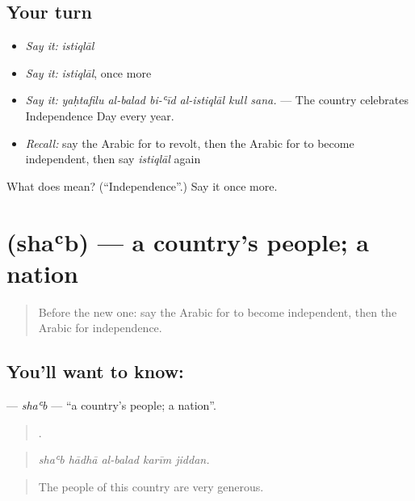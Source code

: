 \subsection*{Your turn}
\begin{itemize}
\raggedright
  \item \emph{Say it:} \emph{istiqlāl}
  \item \emph{Say it:} \emph{istiqlāl}, once more
  \item \emph{Say it:} \emph{yaḥtafilu al-balad bi-ʿīd al-istiqlāl kull sana.} — The country celebrates Independence Day every year.
  \item \emph{Recall:} say the Arabic for to revolt, then the Arabic for to become independent, then say \emph{istiqlāl} again
\end{itemize}

\begin{tcolorbox}[breakable,colback=teal!4,colframe=teal!35!black,title={Before you move on}]
What does  mean? (\textquotedblleft{}Independence\textquotedblright{}.) Say it once more.
\end{tcolorbox}
\section[\texorpdfstring{\ar{شعب} (shaʿb)}{شعب (shaʿb)}]{ (shaʿb) — a country’s people; a nation}

\label{lesson:AR-C329-shab}



\begin{quote}
Before the new one: say the Arabic for to become independent, then the Arabic for independence.
\end{quote}

\subsection*{You'll want to know: }
\textbf{} — \emph{shaʿb} — \textquotedblleft{}a country’s people; a nation\textquotedblright{}.

\begin{quote}
    .
\end{quote}

\begin{quote}
\emph{shaʿb hādhā al-balad karīm jiddan.}
\end{quote}

\begin{quote}
The people of this country are very generous.
\end{quote}

